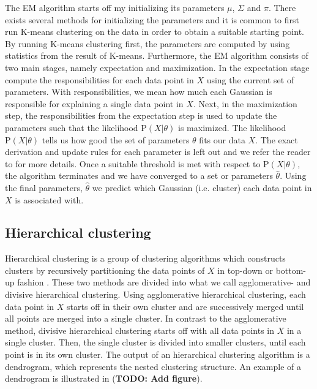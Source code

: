 The EM algorithm starts off my initializing its parameters $\mu$, $\Sigma$ and $\pi$. There exists several methods for initializing the parameters and it is common to first run K-means clustering on the data in order to obtain a suitable starting point. By running K-means clustering first, the parameters are computed by using statistics from the result of K-means. Furthermore, the EM algorithm consists of two main stages, namely expectation and maximization. In the expectation stage compute the responsibilities for each data point in $X$ using the current set of parameters. With responsibilities, we mean how much each Gaussian is responsible for explaining a single data point in $X$. Next, in the maximization step, the responsibilities from the expectation step is used to update the parameters such that the likelihood $\text{P}(X | \theta)$ is maximized. The likelihood $\text{P}(X | \theta)$ tells us how good the set of parameters $\theta$ fits our data $X$. The exact derivation and update rules for each parameter is left out and we refer the reader to \cites[Section 9.4]{bishop2006} for more details. Once a suitable threshold is met with respect to $\text{P}(X | \theta)$, the algorithm terminates and we have converged to a set or parameters $\hat{\theta}$. Using the final parameters, $\hat{\theta}$ we predict which Gaussian (i.e. cluster) each data point in $X$ is associated with.

\subsection{Hierarchical clustering}
Hierarchical clustering is a group of clustering algorithms which constructs clusters by recursively partitioning the data points of $X$ in top-down or bottom-up fashion \cite{Rokach2005}. These two methods are divided into what we call agglomerative- and divisive hierarchical clustering. Using agglomerative hierarchical clustering, each data point in $X$ starts off in their own cluster and are successively merged until all points are merged into a single cluster. In contrast to the agglomerative method, divisive hierarchical clustering starts off with all data points in $X$ in a single cluster. Then, the single cluster is divided into smaller clusters, until each point is in its own cluster. The output of an hierarchical clustering algorithm is a dendrogram, which represents the nested clustering structure. An example of a dendrogram is illustrated in (\textbf{TODO: Add figure}).

